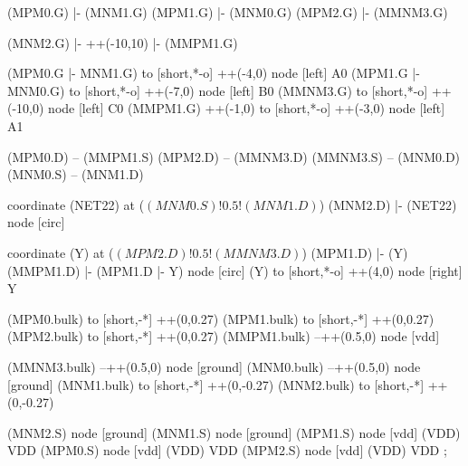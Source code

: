 \begin{circuitikz}[american]
	(MPM0.G) |- (MNM1.G)
	(MPM1.G) |- (MNM0.G)
	(MPM2.G) |- (MMNM3.G)
	
	(MNM2.G) |- ++(-10,10) |- (MMPM1.G)
	
	(MPM0.G |- MNM1.G) to [short,*-o] ++(-4,0) node [left] {A0}
	(MPM1.G |- MNM0.G) to [short,*-o] ++(-7,0) node [left] {B0}
	(MMNM3.G) to [short,*-o] ++(-10,0) node [left] {C0}
	(MMPM1.G) ++(-1,0) to [short,*-o] ++(-3,0) node [left] {A1}
	
	(MPM0.D) -- (MMPM1.S)
	(MPM2.D) -- (MMNM3.D)
	(MMNM3.S) -- (MNM0.D)
	(MNM0.S) -- (MNM1.D)
	
	coordinate (NET22) at ($(MNM0.S)!0.5!(MNM1.D)$)
	(MNM2.D) |- (NET22) node [circ] {}
		
	coordinate (Y) at ($(MPM2.D)!0.5!(MMNM3.D)$)
	(MPM1.D) |- (Y)
	(MMPM1.D) |- (MPM1.D |- Y) node [circ] {}
	(Y) to [short,*-o] ++(4,0) node [right] {Y}
	
	(MPM0.bulk) to [short,-*] ++(0,0.27)
	(MPM1.bulk) to [short,-*] ++(0,0.27)	
	(MPM2.bulk) to [short,-*] ++(0,0.27)	
	(MMPM1.bulk) --++(0.5,0) node [vdd]{}
	
	(MMNM3.bulk) --++(0.5,0) node [ground]{}
	(MNM0.bulk) --++(0.5,0) node [ground]{}
	(MNM1.bulk) to [short,-*] ++(0,-0.27) 
	(MNM2.bulk) to [short,-*] ++(0,-0.27)


	(MNM2.S) node [ground] {}
	(MNM1.S) node [ground] {}
	(MPM1.S) node [vdd] (VDD) {VDD}
	(MPM0.S) node [vdd] (VDD) {VDD}
	(MPM2.S) node [vdd] (VDD) {VDD}
;

\end{circuitikz}
